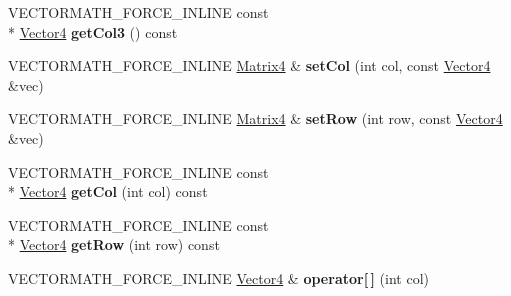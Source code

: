 \begin{DoxyCompactItemize}
\item 
\hypertarget{class_vectormath_1_1_aos_1_1_matrix4_a3fbd9daf860487393aeba6795cff3354}{V\+E\+C\+T\+O\+R\+M\+A\+T\+H\+\_\+\+F\+O\+R\+C\+E\+\_\+\+I\+N\+L\+I\+N\+E const \\*
\hyperlink{class_vectormath_1_1_aos_1_1_vector4}{Vector4} {\bfseries get\+Col3} () const }\label{class_vectormath_1_1_aos_1_1_matrix4_a3fbd9daf860487393aeba6795cff3354}

\item 
\hypertarget{class_vectormath_1_1_aos_1_1_matrix4_a1cc572f1afe0abba620ed52463f85846}{V\+E\+C\+T\+O\+R\+M\+A\+T\+H\+\_\+\+F\+O\+R\+C\+E\+\_\+\+I\+N\+L\+I\+N\+E \hyperlink{class_vectormath_1_1_aos_1_1_matrix4}{Matrix4} \& {\bfseries set\+Col} (int col, const \hyperlink{class_vectormath_1_1_aos_1_1_vector4}{Vector4} \&vec)}\label{class_vectormath_1_1_aos_1_1_matrix4_a1cc572f1afe0abba620ed52463f85846}

\item 
\hypertarget{class_vectormath_1_1_aos_1_1_matrix4_aa973863bc1d06a93d9cdbf8f17a504ec}{V\+E\+C\+T\+O\+R\+M\+A\+T\+H\+\_\+\+F\+O\+R\+C\+E\+\_\+\+I\+N\+L\+I\+N\+E \hyperlink{class_vectormath_1_1_aos_1_1_matrix4}{Matrix4} \& {\bfseries set\+Row} (int row, const \hyperlink{class_vectormath_1_1_aos_1_1_vector4}{Vector4} \&vec)}\label{class_vectormath_1_1_aos_1_1_matrix4_aa973863bc1d06a93d9cdbf8f17a504ec}

\item 
\hypertarget{class_vectormath_1_1_aos_1_1_matrix4_a1a0a7c6626229abc2e589dff87995c34}{V\+E\+C\+T\+O\+R\+M\+A\+T\+H\+\_\+\+F\+O\+R\+C\+E\+\_\+\+I\+N\+L\+I\+N\+E const \\*
\hyperlink{class_vectormath_1_1_aos_1_1_vector4}{Vector4} {\bfseries get\+Col} (int col) const }\label{class_vectormath_1_1_aos_1_1_matrix4_a1a0a7c6626229abc2e589dff87995c34}

\item 
\hypertarget{class_vectormath_1_1_aos_1_1_matrix4_a7a3ce0990b5aaa30c5f7d5c281a64e31}{V\+E\+C\+T\+O\+R\+M\+A\+T\+H\+\_\+\+F\+O\+R\+C\+E\+\_\+\+I\+N\+L\+I\+N\+E const \\*
\hyperlink{class_vectormath_1_1_aos_1_1_vector4}{Vector4} {\bfseries get\+Row} (int row) const }\label{class_vectormath_1_1_aos_1_1_matrix4_a7a3ce0990b5aaa30c5f7d5c281a64e31}

\item 
\hypertarget{class_vectormath_1_1_aos_1_1_matrix4_af36875c0af894fab9226e6b21e466884}{V\+E\+C\+T\+O\+R\+M\+A\+T\+H\+\_\+\+F\+O\+R\+C\+E\+\_\+\+I\+N\+L\+I\+N\+E \hyperlink{class_vectormath_1_1_aos_1_1_vector4}{Vector4} \& {\bfseries operator\mbox{[}$\,$\mbox{]}} (int col)}\label{class_vectormath_1_1_aos_1_1_matrix4_af36875c0af894fab9226e6b21e466884}


\end{DoxyCompactItemize}
